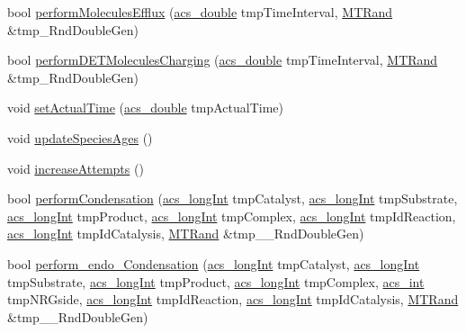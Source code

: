 \begin{DoxyCompactItemize}
\item 
bool \hyperlink{classenvironment_acbbcdb4c77231e9ffa4c169e0caa0d0c}{perform\-Molecules\-Efflux} (\hyperlink{acs__headers_8h_ab776853a005fcbf56af0424a2a4dd607}{acs\-\_\-double} tmp\-Time\-Interval, \hyperlink{class_m_t_rand}{M\-T\-Rand} \&tmp\-\_\-\-Rnd\-Double\-Gen)
\item 
bool \hyperlink{classenvironment_adbaf165a12edd62c614a455544807ea3}{perform\-D\-E\-T\-Molecules\-Charging} (\hyperlink{acs__headers_8h_ab776853a005fcbf56af0424a2a4dd607}{acs\-\_\-double} tmp\-Time\-Interval, \hyperlink{class_m_t_rand}{M\-T\-Rand} \&tmp\-\_\-\-Rnd\-Double\-Gen)
\item 
void \hyperlink{classenvironment_a9bc445da3e89d09d4fce11c83f3dedb0}{set\-Actual\-Time} (\hyperlink{acs__headers_8h_ab776853a005fcbf56af0424a2a4dd607}{acs\-\_\-double} tmp\-Actual\-Time)
\item 
void \hyperlink{classenvironment_adab0607255ca5927b69cb6882917e031}{update\-Species\-Ages} ()
\item 
void \hyperlink{classenvironment_aac3eed768b89e3a70017075b68046ede}{increase\-Attempts} ()
\item 
bool \hyperlink{classenvironment_a1baf5512b7e0a8fb6f8f890ba9f99cd1}{perform\-Condensation} (\hyperlink{acs__headers_8h_a19319d75f02db4308bc5c0026d98cd85}{acs\-\_\-long\-Int} tmp\-Catalyst, \hyperlink{acs__headers_8h_a19319d75f02db4308bc5c0026d98cd85}{acs\-\_\-long\-Int} tmp\-Substrate, \hyperlink{acs__headers_8h_a19319d75f02db4308bc5c0026d98cd85}{acs\-\_\-long\-Int} tmp\-Product, \hyperlink{acs__headers_8h_a19319d75f02db4308bc5c0026d98cd85}{acs\-\_\-long\-Int} tmp\-Complex, \hyperlink{acs__headers_8h_a19319d75f02db4308bc5c0026d98cd85}{acs\-\_\-long\-Int} tmp\-Id\-Reaction, \hyperlink{acs__headers_8h_a19319d75f02db4308bc5c0026d98cd85}{acs\-\_\-long\-Int} tmp\-Id\-Catalysis, \hyperlink{class_m_t_rand}{M\-T\-Rand} \&tmp\-\_\-\-\_\-\-Rnd\-Double\-Gen)
\item 
bool \hyperlink{classenvironment_aa7a2cc95d8ba242c805a8fda063b23a7}{perform\-\_\-endo\-\_\-\-Condensation} (\hyperlink{acs__headers_8h_a19319d75f02db4308bc5c0026d98cd85}{acs\-\_\-long\-Int} tmp\-Catalyst, \hyperlink{acs__headers_8h_a19319d75f02db4308bc5c0026d98cd85}{acs\-\_\-long\-Int} tmp\-Substrate, \hyperlink{acs__headers_8h_a19319d75f02db4308bc5c0026d98cd85}{acs\-\_\-long\-Int} tmp\-Product, \hyperlink{acs__headers_8h_a19319d75f02db4308bc5c0026d98cd85}{acs\-\_\-long\-Int} tmp\-Complex, \hyperlink{acs__headers_8h_a8d277355641a098190360234e2ebde35}{acs\-\_\-int} tmp\-N\-R\-Gside, \hyperlink{acs__headers_8h_a19319d75f02db4308bc5c0026d98cd85}{acs\-\_\-long\-Int} tmp\-Id\-Reaction, \hyperlink{acs__headers_8h_a19319d75f02db4308bc5c0026d98cd85}{acs\-\_\-long\-Int} tmp\-Id\-Catalysis, \hyperlink{class_m_t_rand}{M\-T\-Rand} \&tmp\-\_\-\-\_\-\-Rnd\-Double\-Gen)

\end{DoxyCompactItemize}
